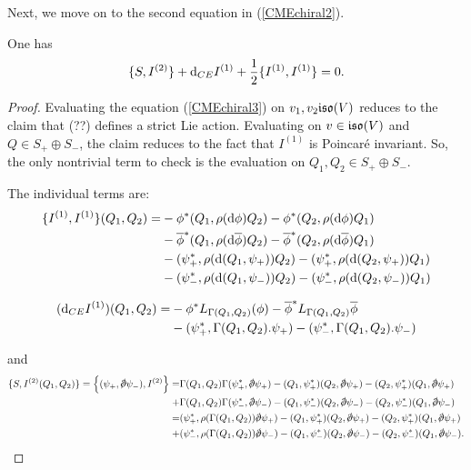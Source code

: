 \documentclass[10pt, oneside]{article}
\begin{document}
Next, we move on to the second equation in (\ref{CMEchiral2}). 

\begin{lemma} 
One has
\begin{equation}\label{CMEchiral3}
\{S, I^{(2)}\} + {\rm d}_{CE} I^{(1)} + \frac{1}{2} \{I^{(1)}, I^{(1)}\} = 0 .
\end{equation}
\end{lemma}
\begin{proof}
Evaluating the equation (\ref{CMEchiral3}) on $v_1,v_2 \mathfrak{iso}(V)$ reduces to the claim that (??) defines a strict Lie action. 
Evaluating on $v \in \mathfrak{iso}(V)$ and $Q \in S_+ \oplus S_-$, the claim reduces to the fact that $I^{(1)}$ is Poincar\'{e} invariant.
So, the only nontrivial term to check is the evaluation on $Q_1,Q_2 \in S_+ \oplus S_-$. 

The individual terms are:
\begin{align*}
\{I^{(1)}, I^{(1)}\}(Q_1, Q_2) = & - \phi^* (Q_1, \rho({\rm d} \phi) Q_2) - \phi^* (Q_2, \rho({\rm d} \phi)Q_1) \\ & - \overline{\phi}^* (Q_1, \rho({\rm d} \overline{\phi}) Q_2) - \overline{\phi}^* (Q_2, \rho({\rm d} \overline{\phi})Q_1) \\ &  -  (\psi_+^*, \rho({\rm d}(Q_1,\psi_+))Q_2) - (\psi_+^*, \rho({\rm d}(Q_2, \psi_+)) Q_1) \\ & - (\psi_-^*, \rho({\rm d}(Q_1, \psi_-)) Q_2) - (\psi_-^*, \rho({\rm d}(Q_2, \psi_-))Q_1) 
\end{align*}

\begin{align*}
({\rm d}_{CE}I^{(1)})(Q_1,Q_2) = & - \phi^* L_{\Gamma(Q_1,Q_2)} (\phi) - \overline{\phi}^* L_{\Gamma(Q_1,Q_2)} \overline{\phi} \\ &  - (\psi_+^* , \Gamma(Q_1,Q_2) . \psi_+) - (\psi_-^*, \Gamma(Q_1,Q_2) . \psi_-)
\end{align*}

and
\begin{align*}
\{S, I^{(2)}(Q_1,Q_2)\} = \left\{(\psi_+ , \sd \dd \psi_-), I^{(2)} \right\} = & \Gamma(Q_1,Q_2) \Gamma(\psi_+^*, \sd \dd \psi_+) - (Q_1 , \psi_+^*)(Q_2, \sd \dd \psi_+) - (Q_2, \psi_+^*)(Q_1, \sd\dd \psi_+)  \\ 
 + & \Gamma(Q_1, Q_2) \Gamma(\psi_-^*, \sd \dd \psi_-) - (Q_1 , \psi_-^*)(Q_2, \sd \dd \psi_-) - (Q_2, \psi_-^*)(Q_1, \sd\dd \psi_-) \\
 = & (\psi_+^*, \rho(\Gamma(Q_1,Q_2)) \sd \dd \psi_+) - (Q_1 , \psi_+^*)(Q_2, \sd \dd \psi_+) - (Q_2, \psi_+^*)(Q_1, \sd\dd \psi_+) \\ 
 + & (\psi_-^*, \rho(\Gamma(Q_1,Q_2)) \sd \dd \psi_-) - (Q_1 , \psi_-^*)(Q_2, \sd \dd \psi_-) - (Q_2, \psi_-^*)(Q_1, \sd\dd \psi_-) .
\end{align*}


\end{proof}
\end{document}
